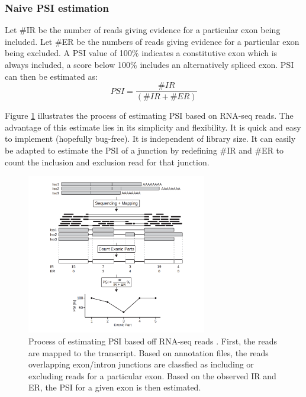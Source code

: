 \subsubsection{Naive PSI estimation}\label{subsubsec:naivepsi}

Let \#IR be the number of reads giving evidence for a particular exon being included. Let \#ER be the numbers of reads giving evidence for a particular exon being excluded. A PSI value of 100\% indicates a constitutive exon which is always included, a score below 100\% includes an alternatively spliced exon. PSI can then be estimated as:
$$PSI = \frac{\#IR}{(\#IR+\#ER)}$$

Figure \ref{fig:psiestimation} illustrates the process of estimating PSI based on RNA-seq reads.  
The advantage of this estimate lies in its simplicity and flexibility. It is quick and easy to implement (hopefully bug-free). It is independent of library size. It can easily be adapted to estimate the PSI of a junction by redefining \#IR and \#ER to count the inclusion and exclusion read for that junction.

\begin{figure}[h]
	\centering\includegraphics[width=0.7\textwidth]{../visualizations/ch4-methods/psi_estimation.png} 
	\caption{
		Process of estimating PSI based off RNA-seq reads \cite{berlinpsi}. First, the reads are mapped to the transcript. Based on annotation files, the reads overlapping exon/intron junctions are classfied as including or excluding reads for a particular exon. Based on the observed IR and ER, the PSI for a given exon is then estimated.
		}
	\label{fig:psiestimation}
\end{figure}

